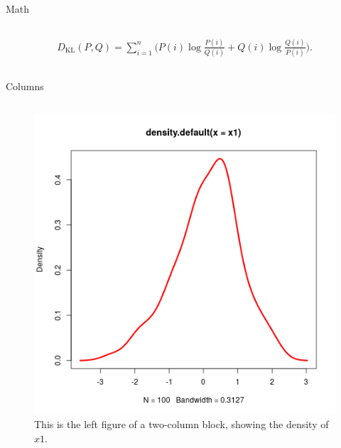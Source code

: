 \documentclass[final]{beamer}
\newcommand\sumin{\sum_{i=1}^{n}}
\newcommand{\Xoi}[1]{#1(i)}
\newcommand{\frakPQ}[2]{\frac{\Xoi{#1}}{\Xoi{#2}}}
\newcommand{\DKLPQ}[3]{D_{\mathrm{KL}}(#1 #3 #2)}
\begin{document}
\begin{frame}[fragile,label={sec:org10a116a}]{}
\begin{columns}
\begin{column}[t]{0.45\columnwidth}
\begin{block}{Math}
\begin{columns}
\begin{column}[T]{0.78\columnwidth}
\begin{align} 
\label{eq:KL2} 
\DKLPQ{P}{Q}{,} = \sumin \Big(\Xoi{P} \log \frakPQ{P}{Q} + \Xoi{Q} \log \frakPQ{Q}{P} \Big).
\end{align}
\end{column}
\end{columns}
\end{block}

\begin{block}{Columns}
\begin{columns}
\begin{column}[T]{0.48\columnwidth}
\captionsetup{justification=justified,width=.85\linewidth}
\begin{figure}[htbp]
\centering
\includegraphics[width=.9\linewidth]{4l.png}
\caption{\label{fig:orgf47550b}
This is the left figure of a two-column block, showing the density of \(x1\).}
\end{figure}
\end{column}


\end{columns}
\end{block}
\end{column}
\end{columns}
\end{frame}
\end{document}
